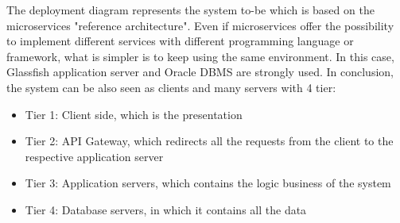 The deployment diagram represents the system to-be which is based on the microservices "reference architecture". Even if 
microservices offer the possibility to implement different services with different programming language or framework, what is simpler 
is to keep using the same environment. In this case, Glassfish application server and Oracle DBMS are strongly used. In conclusion, 
the system can be also seen as clients and many servers with 4 tier:
\begin{itemize}
\item Tier 1: Client side, which is the presentation
\item Tier 2: API Gateway, which redirects all the requests from the client to the respective application server
\item Tier 3: Application servers, which contains the logic business of the system
\item Tier 4: Database servers, in which it contains all the data
\end{itemize}